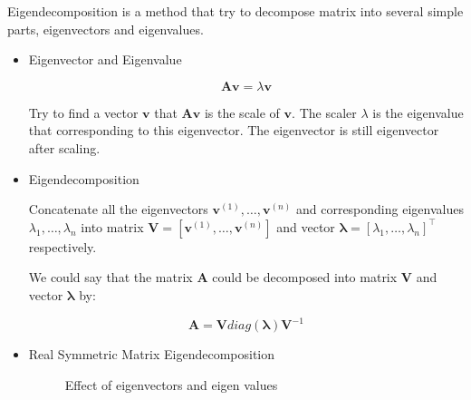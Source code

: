 
Eigendecomposition is a method that try to decompose matrix into several simple parts,
  eigenvectors and eigenvalues.

\begin{itemize}
  \item Eigenvector and Eigenvalue

  \begin{equation} \tag{2.39}
    \label{eq_2_39}
    \bm{Av} = \lambda \bm{v}
  \end{equation}

  Try to find a vector $\bm{v}$ that $\bm{Av}$ is the scale of $\bm{v}$.
    The scaler $\lambda$ is the eigenvalue that corresponding to this eigenvector.
    The eigenvector is still eigenvector after scaling.

  \item Eigendecomposition

  Concatenate all the eigenvectors $\bm{v} ^ {(1)} , \ldots , \bm{v} ^ {(n)}$
    and corresponding eigenvalues $\lambda _ {1} , \ldots , \lambda _ {n}$
    into matrix $\bm{V} = [ \bm{v} ^ {(1)} , \ldots , \bm{v} ^ {(n)} ]$
    and vector ${\bm{\lambda} = [ \lambda _ {1} , \ldots , \lambda _ {n} ]} ^ \top$
    respectively.

  We could say that the matrix $\bm{A}$ could be decomposed into matrix $\bm{V}$ and vector $\bm{\lambda}$ by:

  \begin{equation} \tag{2.40}
    \label{eq_2_40}
    \bm{A} = \bm{V} diag(\bm{\lambda}) \bm{V} ^ {-1}
  \end{equation}

  \newpage

  \item Real Symmetric Matrix Eigendecomposition

  \setcounter{figure}{2}
  \begin{figure}[ht]
    \begin{center}
      Effect of eigenvectors and eigen values\par
\end{center}
\end{figure}
\end{itemize}
